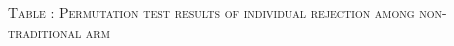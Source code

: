 \hfil\begin{minipage}[t]{14cm}
\hfil\textsc{\normalsize Table \thetable: Permutation test results of individual rejection among non-traditional arm\label{tab Ireject nontrad perm}}\\
\setlength{\tabcolsep}{.5pt}
\setlength{\baselineskip}{8pt}
\renewcommand{\arraystretch}{.50}
\hfil{}\\
\end{minipage}






